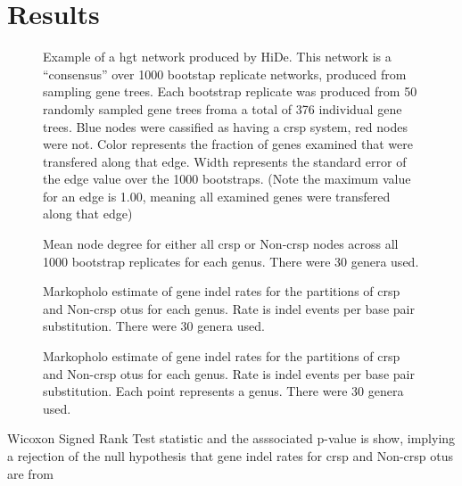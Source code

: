\section{Results}
\FloatBarrier
\begin{figure}[htb!]
    \caption{Example of a \ac{hgt} network produced by HiDe. This network is a ``consensus'' over 1000 bootstap replicate networks, produced from sampling gene trees. Each bootstrap replicate was produced from 50 randomly sampled gene trees froma a total of 376 individual gene trees. Blue nodes were cassified as having a \ac{crsp} system, red nodes were not. Color represents the fraction of genes examined that were transfered along that edge. Width represents the standard error of the edge value over the 1000 bootstraps. (Note the maximum value for an edge is 1.00, meaning all examined genes were transfered along that edge)}
    \label{net}
\end{figure}
\FloatBarrier
\FloatBarrier
\begin{figure}[htb!]
    \caption{Mean node degree for either all \ac{crsp} or Non-\ac{crsp} nodes across all 1000 bootstrap replicates for each genus. There were 30 genera used.}
\end{figure}
\FloatBarrier
\FloatBarrier
\begin{figure}[htb!]
    \caption{Markopholo estimate of gene indel rates for the partitions of \ac{crsp} and Non-\ac{crsp} \ac{otu}s for each genus. Rate is indel events per base pair substitution. There were 30 genera used.}
\end{figure}
\FloatBarrier
\FloatBarrier
\begin{figure}[htb!]
    \caption{Markopholo estimate of gene indel rates for the partitions of \ac{crsp} and Non-\ac{crsp} \ac{otu}s for each genus. Rate is indel events per base pair substitution. Each point represents a genus. There were 30 genera used.}
\end{figure}
\FloatBarrier
Wicoxon Signed Rank Test statistic and the asssociated p-value is show, implying a rejection of the null hypothesis that gene indel rates for \ac{crsp} and Non-\ac{crsp} \ac{otu}s are from
